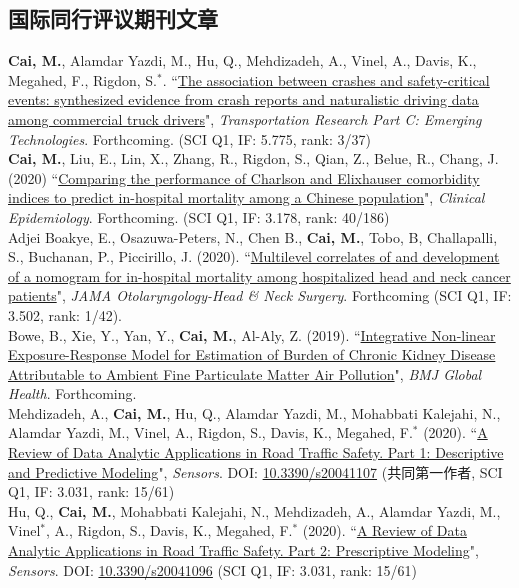 \documentclass[11pt, a4paper]{article}
\newcommand{\years}[1]{\marginnote{\scriptsize #1}}
\begin{document}
\subsection*{国际同行评议期刊文章}
\noindent
\years{2020}\textbf{Cai, M.}, Alamdar Yazdi, M., Hu, Q., Mehdizadeh, A., Vinel, A., Davis, K., Megahed, F., Rigdon, S.$^\ast$. ``\ul{The association between crashes and safety-critical events: synthesized evidence from crash reports and naturalistic driving data among commercial truck drivers}", \emph{Transportation Research Part C: Emerging Technologies}. Forthcoming. (SCI Q1, IF: 5.775, rank: 3/37)\\[6pt]
\years{2020}\textbf{Cai, M.}, Liu, E., Lin, X., Zhang, R., Rigdon, S., Qian, Z., Belue, R., Chang, J. (2020) ``\ul{Comparing the performance of Charlson and Elixhauser comorbidity indices to predict in-hospital mortality among a Chinese population}", \emph{Clinical Epidemiology}. Forthcoming. (SCI Q1, IF: 3.178, rank: 40/186)\\[6pt]
\years{2020}Adjei Boakye, E., Osazuwa-Peters, N., Chen B., \textbf{Cai, M.}, Tobo, B, Challapalli, S., Buchanan, P., Piccirillo, J. (2020). ``\ul{Multilevel correlates of and development of a nomogram for in-hospital mortality among hospitalized head and neck cancer patients}", \emph{JAMA Otolaryngology-Head \& Neck Surgery}. Forthcoming (SCI Q1, IF: 3.502, rank: 1/42).\\[6pt]
\years{2020}Bowe, B., Xie, Y., Yan, Y., \textbf{Cai, M.}, Al-Aly, Z. (2019). ``\ul{Integrative Non-linear Exposure-Response Model for Estimation of Burden of Chronic Kidney Disease Attributable to Ambient Fine Particulate Matter Air Pollution}", \emph{BMJ Global Health}. Forthcoming. \\[6pt]
\years{2020}Mehdizadeh, A., \textbf{Cai, M.}, Hu, Q., Alamdar Yazdi, M., Mohabbati Kalejahi, N., Alamdar Yazdi, M., Vinel, A., Rigdon, S., Davis, K., Megahed, F.$^\ast$ (2020). ``\ul{A Review of Data Analytic Applications in Road Traffic Safety. Part 1: Descriptive and Predictive Modeling}", \emph{Sensors}. DOI: \href{https://doi.org/10.3390/s20041107}{10.3390/s20041107} (共同第一作者, SCI Q1, IF: 3.031, rank: 15/61)\\[6pt]
\years{2020}Hu, Q., \textbf{Cai, M.}, Mohabbati Kalejahi, N., Mehdizadeh, A., Alamdar Yazdi, M., Vinel$^\ast$, A., Rigdon, S., Davis, K., Megahed, F.$^\ast$ (2020). ``\ul{A Review of Data Analytic Applications in Road Traffic Safety. Part 2: Prescriptive Modeling}", \emph{Sensors}. DOI: \href{https://doi.org/10.3390/s20041096}{10.3390/s20041096} (SCI Q1, IF: 3.031, rank: 15/61)\\[6pt]
\end{document}
